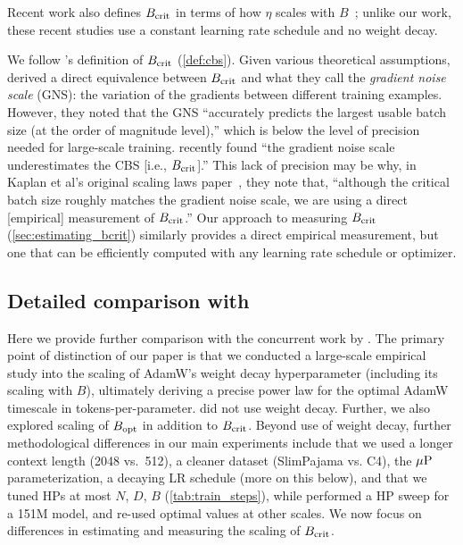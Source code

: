 Recent work also defines $B_{\text{crit}}$ in terms of how $\eta$ scales with
$B$~\citep{filatov2024time,li2024surge}; unlike our work, these recent
studies use a constant learning rate schedule and no weight decay.

We follow \citet{mccandlish2018empirical}'s definition of $B_{\text{crit}}$
(\cref{def:cbs}).
%
Given various theoretical assumptions, \citet{mccandlish2018empirical}
derived a direct equivalence between $B_{\text{crit}}$ and what they call the
\emph{gradient noise scale} (GNS): the variation of the gradients
between different training examples.
%
However, they noted that the GNS ``accurately predicts the largest
usable batch size (at the order of magnitude level),'' which is below
the level of precision needed for large-scale training.
%
\citet{merrill2025critical} recently found ``the gradient noise scale
underestimates the CBS [i.e., $B_{\text{crit}}$].''
%
This lack of precision may be why, in Kaplan et al's original scaling
laws paper~\citep{kaplan2020scaling}, they note that, ``although the
critical batch size roughly matches the gradient noise scale, we are
using a direct [empirical] measurement of $B_{\text{crit}}$.'' Our approach to
measuring $B_{\text{crit}}$ (\cref{sec:estimating_bcrit}) similarly provides a
direct empirical measurement, but one that can be efficiently computed
with any learning rate schedule or optimizer.

\subsection{Detailed comparison with \citet{zhang2024how}}\label{sec:appendix_zhang}

Here we provide further comparison with the concurrent work
by \citet{zhang2024how}.
%
The primary point of distinction of our paper is that we conducted a
large-scale empirical study into the scaling of AdamW's weight decay
hyperparameter (including its scaling with $B$), ultimately deriving a
precise power law for the optimal AdamW timescale in
tokens-per-parameter.  \citet{zhang2024how} did not use weight decay.
Further, we also explored scaling of $B_{\text{opt}}$ in addition to $B_{\text{crit}}$.
%
Beyond use of weight decay, further methodological differences in our
main experiments include that we used a longer context length (2048
vs.\ 512), a cleaner dataset (SlimPajama vs. C4), the $\mbox{$\mu$P}$
parameterization, a decaying LR schedule (more on this below), and
that we tuned HPs at most $N$, $D$, $B$ (\cref{tab:train_steps}),
while \citet{zhang2024how} performed a HP sweep for a 151M model, and
re-used optimal values at other scales.
%
We now focus on differences in estimating and measuring the scaling of
$B_{\text{crit}}$.

